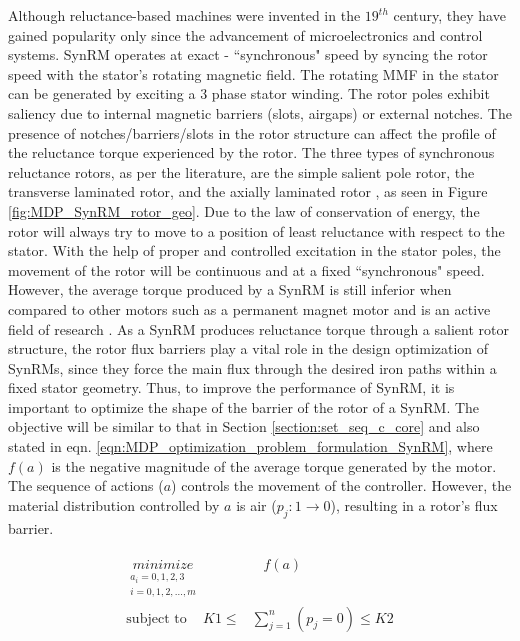 Although reluctance-based machines were invented in the $19^{th}$ century, they have gained popularity only since the advancement of microelectronics and control systems.
SynRM operates at exact - ``synchronous" speed by syncing the rotor speed with the stator's rotating magnetic field.  
The rotating MMF in the stator can be generated by exciting a 3 phase stator winding. The rotor poles exhibit saliency due to internal magnetic barriers (slots, airgaps) or external notches. The presence of notches/barriers/slots in the rotor structure can affect the profile of the reluctance torque experienced by the rotor. The three types of synchronous reluctance rotors, as per the literature, are the simple salient pole rotor, the transverse laminated rotor, and the axially laminated rotor \parencite{kolehmainen2010synchronous}, as seen in Figure \ref{fig:MDP_SynRM_rotor_geo}. Due to the law of conservation of energy, the rotor will always try to move to a position of least reluctance with respect to the stator. With the help of proper and controlled excitation in the stator poles, the movement of the rotor will be continuous and at a fixed ``synchronous" speed. However, the average torque produced by a SynRM is still inferior when compared to other motors such as a permanent magnet motor \parencite{murakami1999performance} and is an active field of research \parencite{li2013multiobjective, hidaka2017topology, kim2010topology}. As a SynRM produces reluctance torque through a salient rotor structure, the rotor flux barriers play a vital role in the design optimization of SynRMs, since they force the main flux through the desired iron paths within a fixed stator geometry. Thus, to improve the performance of SynRM, it is important to optimize the shape of the barrier of the rotor of a SynRM. The objective will be similar to that in Section \ref{section:set_seq_c_core} and also stated in eqn. \ref{eqn:MDP_optimization_problem_formulation_SynRM}, where $f(a)$ is the negative magnitude of the average torque generated by the motor. The sequence of actions ($a$) controls the movement of the controller. 
However, the material distribution controlled by $a$ is air ($p_j: 1 \rightarrow 0$), resulting in a rotor's flux barrier.

\begin{align}
    \begin{split}
        \underset{\substack{a_i = {0, 1, 2, 3} \\ i = 0, 1, 2, \hdots, m}}{minimize} & \hspace{10pt} f(a) \\
        \text{subject to} \hspace{14pt} K1 \leq & \sum_{j=1}^n (p_j = 0) \leq K2 \label{eqn:MDP_optimization_problem_formulation_SynRM}
    \end{split}
\end{align}

